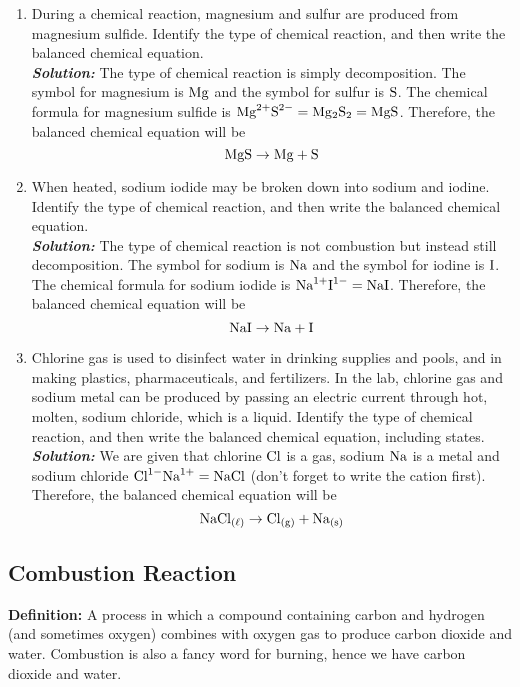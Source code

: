\documentclass[12pt]{report}
\begin{document}
\begin{enumerate}
    \item{During a chemical reaction, magnesium and sulfur are produced from magnesium sulfide. Identify the type of chemical reaction, and then write the balanced chemical equation.}\\

    \textit{\textbf{Solution:}} The type of chemical reaction is simply decomposition. The symbol for magnesium is $ \ce{Mg}$ and the symbol for sulfur is $ \ce{S}$. The chemical formula for magnesium sulfide is $ \text{Mg}^{2+} \text{S}^{2-}= \ce{Mg2S2}= \ce{MgS}$. Therefore, the balanced chemical equation will be 
    \[
        \ce{MgS}\to \ce{Mg}+ \ce{S}
    \]

    \item{When heated, sodium iodide may be broken down into sodium and iodine. Identify the type of chemical reaction, and then write the balanced chemical equation.}\\

    \textit{\textbf{Solution:}} The type of chemical reaction is not combustion but instead still decomposition. The symbol for sodium is $ \ce{Na}$ and the symbol for iodine is $ \ce{I}$. The chemical formula for sodium iodide is $ \text{Na}^{1+} \text{I}^{1-}= \ce{NaI}$. Therefore, the balanced chemical equation will be 
    \[
        \ce{NaI}\to \ce{Na}+ \ce{I}
    \]
    
    \item{Chlorine gas is used to disinfect water in drinking supplies and pools, and in making plastics, pharmaceuticals, and fertilizers. In the lab, chlorine gas and sodium metal can be produced by passing an electric current through hot, molten, sodium chloride, which is a liquid. Identify the type of chemical reaction, and then write the balanced chemical equation, including states.}\\

    \textit{\textbf{Solution:}} We are given that chlorine $ \ce{Cl}$ is a gas, sodium $ \ce{Na}$ is a metal and sodium chloride $ \text{Cl}^{1-} \text{Na}^{1+}= \ce{NaCl}$ (don't forget to write the cation first). Therefore, the balanced chemical equation will be 
    \[
        \ce{NaCl_{( \ell )}}\to\ce{Cl_{(g)}}+ \ce{Na_{(s)}}
    \]

\end{enumerate}

\subsection{Combustion Reaction}
\textbf{Definition:} A process in which a compound containing carbon and hydrogen (and sometimes oxygen) combines with oxygen gas to produce carbon dioxide and water. Combustion is also a fancy word for burning, hence we have carbon dioxide and water. \\
\end{document}
